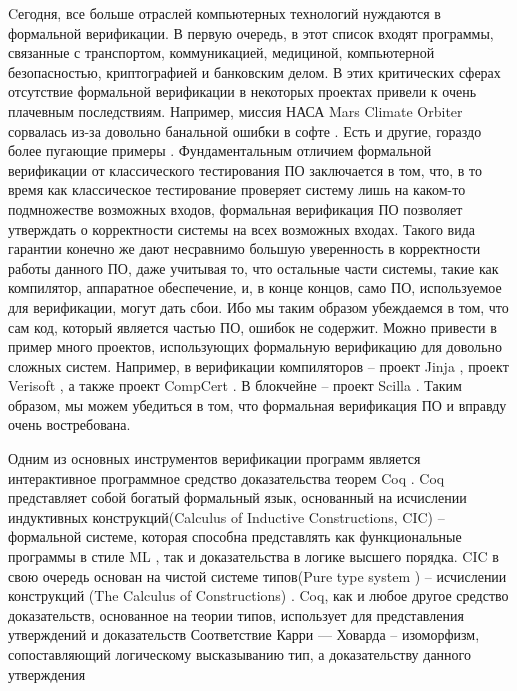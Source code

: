 Cегодня, все больше отраслей компьютерных технологий нуждаются в формальной верификации. В первую очередь, в этот список входят программы,
связанные с транспортом, коммуникацией, медициной, компьютерной безопасностью, криптографией и банковским делом.
В этих критических сферах
отсутствие формальной верификации в некоторых проектах привели к очень плачевным последствиям. Например, миссия НАСА Mars Climate Orbiter
сорвалась из-за довольно банальной ошибки в софте \cite{horror}. Есть и другие, гораздо более пугающие примеры \cite{horror}.
Фундаментальным отличием формальной верификации от классического тестирования ПО заключается в том, что, в то время как классическое
тестирование проверяет систему лишь на каком-то подмножестве возможных входов, формальная верификация ПО позволяет утверждать о
корректности системы на всех возможных входах. Такого вида гарантии конечно же дают несравнимо большую уверенность в корректности
работы данного ПО, даже учитывая то, что остальные части системы, такие как компилятор, аппаратное обеспечение, и,
в конце концов, само ПО, используемое для верификации, могут дать сбои. Ибо мы таким образом убеждаемся в том, что сам код, который
является частью ПО, ошибок не содержит. Можно привести в пример много проектов, использующих формальную верификацию для довольно сложных
систем. Например, в верификации компиляторов -- проект Jinja \cite{KleinN-TCS,KleinN-ACM}, проект Verisoft
\cite{Strecker_compilerverification,Leinenbach}, а также проект CompCert \cite{Xavier,CompCert}.
В блокчейне -- проект Scilla \cite{sergey2018scilla}. Таким образом, мы можем убедиться в том, что формальная верификация ПО
и вправду очень востребована.
\par
Одним из основных инструментов верификации программ является интерактивное программное средство доказательства теорем Coq
\cite{the_coq_development_team_2021_4501022}. Coq представляет собой богатый формальный язык, основанный на
исчислении индуктивных конструкций(Calculus of Inductive Constructions, CIC) \cite{CIC} -- формальной системе, которая способна
представлять как функциональные программы в стиле ML \cite{ML-lang}, так и доказательства в логике высшего порядка. CIC в свою
очередь основан на чистой системе типов(Pure type system \cite{PTS}) -- исчислении конструкций (The Calculus of Constructions) \cite{CalculusOfConstructions}.
Coq, как и любое другое средство доказательств, основанное на теории типов, использует для представления утверждений и доказательств
Соответствие Карри — Ховарда \cite{CurryHowardIsom} -- изоморфизм, сопоставляющий логическому высказыванию тип, а доказательству данного утверждения
